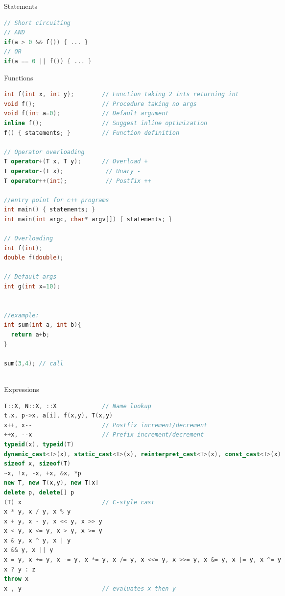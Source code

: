 \documentclass[final]{beamer}
\begin{document}
\begin{frame}[t,fragile]
\begin{columns}[t,totalwidth=\paperwidth, colsep=0.015\paperwidth]
\begin{column}{0.32\paperwidth}
\begin{block}{Statements}
\begin{lstlisting}[language=C++]
// Short circuiting
// AND
if(a > 0 && f()) { ... }
// OR
if(a == 0 || f()) { ... }
\end{lstlisting}

\end{block}




\begin{block}{Functions}
\begin{lstlisting}[language=C++]
int f(int x, int y);        // Function taking 2 ints returning int
void f();                   // Procedure taking no args
void f(int a=0);            // Default argument
inline f();                 // Suggest inline optimization
f() { statements; }         // Function definition

// Operator overloading
T operator+(T x, T y);      // Overload +
T operator-(T x);            // Unary -
T operator++(int);           // Postfix ++

//entry point for c++ programs
int main() { statements; }     
int main(int argc, char* argv[]) { statements; } 

// Overloading
int f(int);
double f(double);

// Default args
int g(int x=10);


//example:
int sum(int a, int b){
  return a+b;
}

sum(3,4); // call



\end{lstlisting}
\end{block}




\begin{block}{Expressions}
\begin{lstlisting}[language=C++]
T::X, N::X, ::X             // Name lookup
t.x, p->x, a[i], f(x,y), T(x,y)
x++, x--                    // Postfix increment/decrement
++x, --x                    // Prefix increment/decrement
typeid(x), typeid(T)
dynamic_cast<T>(x), static_cast<T>(x), reinterpret_cast<T>(x), const_cast<T>(x)
sizeof x, sizeof(T)
~x, !x, -x, +x, &x, *p
new T, new T(x,y), new T[x]
delete p, delete[] p
(T) x                       // C-style cast
x * y, x / y, x % y
x + y, x - y, x << y, x >> y
x < y, x <= y, x > y, x >= y
x & y, x ^ y, x | y
x && y, x || y
x = y, x += y, x -= y, x *= y, x /= y, x <<= y, x >>= y, x &= y, x |= y, x ^= y
x ? y : z
throw x
x , y                       // evaluates x then y
\end{lstlisting}
\end{block}


\end{column}
\end{columns}
\end{frame}
\end{document}
